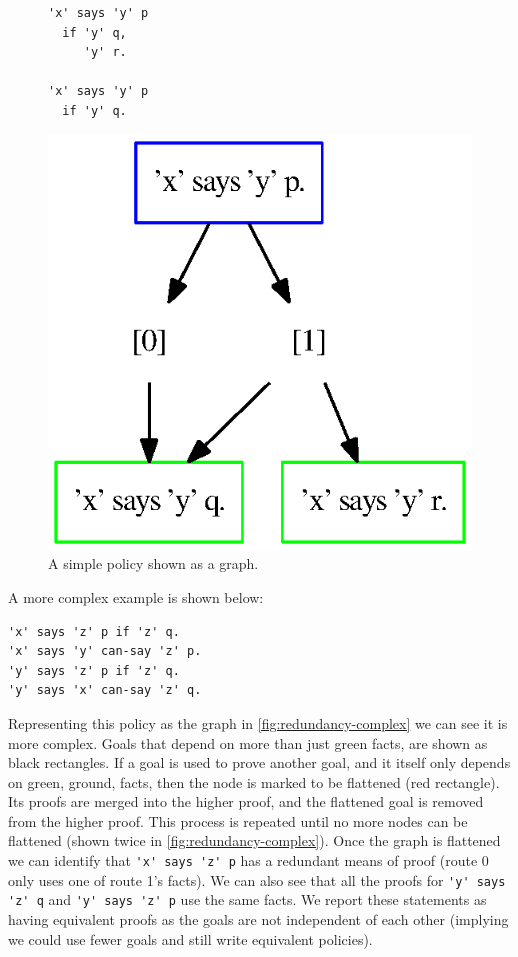 \documentclass[thesis.tex]{subfiles}
\begin{document}
\begin{figure}
  \centering
  \begin{minipage}{0.4\linewidth}
    \begin{lstlisting}
'x' says 'y' p
  if 'y' q,
     'y' r.

'x' says 'y' p
  if 'y' q.
    \end{lstlisting}
  \end{minipage}
  \begin{minipage}{0.59\linewidth}
    \scriptsize{}\centering
    \def\svgwidth{\columnwidth}
    \includegraphics[width=0.59\linewidth]{figures/redundancy-simple.eps}
  \end{minipage}
  \caption{A simple policy shown as a graph.}
  \label{fig:redundancy-graph-simple}
\end{figure}

A more complex example is shown below:

\begin{lstlisting}
'x' says 'z' p if 'z' q.
'x' says 'y' can-say 'z' p.
'y' says 'z' p if 'z' q.
'y' says 'x' can-say 'z' q.
\end{lstlisting}

Representing this policy as the graph in \autoref{fig:redundancy-complex} we can see it is more complex. Goals that
depend on more than just green facts, are shown as black rectangles.  If a goal
is used to prove another goal, and it itself only depends on green, ground,
facts, then the node is marked to be flattened (red rectangle).  Its proofs are
merged into the higher proof, and the flattened goal is removed from the higher
proof.  This process is repeated until no more nodes can be flattened (shown
twice in \autoref{fig:redundancy-complex}).  Once the graph is flattened we can
identify that \lstinline!'x' says 'z' p! has a redundant means of proof (route
0 only uses one of route 1's facts).  We can also see that all the proofs for
\lstinline!'y' says 'z' q! and \lstinline!'y' says 'z' p! use the same facts.
We report these statements as having equivalent proofs as the goals are not
independent of each other (implying we could use fewer goals and still write
equivalent policies).
\end{document}
